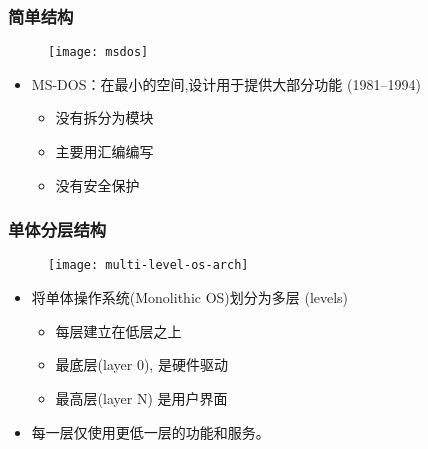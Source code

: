 \begin{frame}

\frametitle{简单结构}

\begin{figure}
	\centering
	\texttt{[image: msdos]}
\end{figure}

\begin{itemize}
\item MS-DOS：在最小的空间,设计用于提供大部分功能 (1981--1994)
	\begin{itemize}
	\item 没有拆分为模块
	\item 主要用汇编编写
	\item 没有安全保护
	\end{itemize}
\end{itemize}

\end{frame}

\begin{frame}
	
	\frametitle{单体分层结构}
	
	\begin{figure}
		\centering
		\texttt{[image: multi-level-os-arch]}
	\end{figure}

	
	\begin{itemize}
		\item 将单体操作系统(Monolithic OS)划分为多层 (levels)
		\begin{itemize}
			\item 每层建立在低层之上
			\item 最底层(layer 0), 是硬件驱动
			\item 最高层(layer N) 是用户界面
		\end{itemize}
	\item 每一层仅使用更低一层的功能和服务。
	\end{itemize}

\end{frame}

